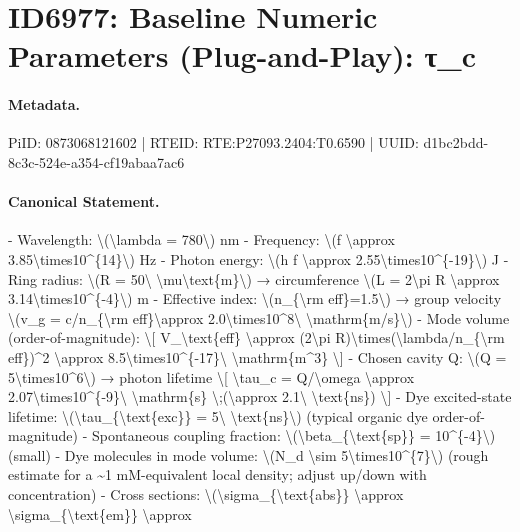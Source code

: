 \section*{ID6977: Baseline Numeric Parameters (Plug-and-Play): τ\_c}
\paragraph{Metadata.}
PiID: 0873068121602 | RTEID: RTE:P27093.2404:T0.6590 | UUID: d1bc2bdd-8c3c-524e-a354-cf19abaa7ac6

\paragraph{Canonical Statement.}
- Wavelength: \textbackslash{}(\textbackslash{}lambda = 780\textbackslash{}) nm - Frequency: \textbackslash{}(f \textbackslash{}approx 3.85\textbackslash{}times10\textasciicircum{}\{14\}\textbackslash{}) Hz - Photon energy: \textbackslash{}(h f \textbackslash{}approx 2.55\textbackslash{}times10\textasciicircum{}\{-19\}\textbackslash{}) J - Ring radius: \textbackslash{}(R = 50\textbackslash{} \textbackslash{}mu\textbackslash{}text\{m\}\textbackslash{}) → circumference \textbackslash{}(L = 2\textbackslash{}pi R \textbackslash{}approx 3.14\textbackslash{}times10\textasciicircum{}\{-4\}\textbackslash{}) m - Effective index: \textbackslash{}(n\_\{\textbackslash{}rm eff\}=1.5\textbackslash{}) → group velocity \textbackslash{}(v\_g = c/n\_\{\textbackslash{}rm eff\}\textbackslash{}approx 2.0\textbackslash{}times10\textasciicircum{}8\textbackslash{} \textbackslash{}mathrm\{m/s\}\textbackslash{}) - Mode volume (order-of-magnitude): \textbackslash{}[ V\_\textbackslash{}text\{eff\} \textbackslash{}approx (2\textbackslash{}pi R)\textbackslash{}times(\textbackslash{}lambda/n\_\{\textbackslash{}rm eff\})\textasciicircum{}2 \textbackslash{}approx 8.5\textbackslash{}times10\textasciicircum{}\{-17\}\textbackslash{} \textbackslash{}mathrm\{m\textasciicircum{}3\} \textbackslash{}] - Chosen cavity Q: \textbackslash{}(Q = 5\textbackslash{}times10\textasciicircum{}6\textbackslash{}) → photon lifetime \textbackslash{}[ \textbackslash{}tau\_c = Q/\textbackslash{}omega \textbackslash{}approx 2.07\textbackslash{}times10\textasciicircum{}\{-9\}\textbackslash{} \textbackslash{}mathrm\{s\} \textbackslash{};(\textbackslash{}approx 2.1\textbackslash{} \textbackslash{}text\{ns\}) \textbackslash{}] - Dye excited-state lifetime: \textbackslash{}(\textbackslash{}tau\_\{\textbackslash{}text\{exc\}\} = 5\textbackslash{} \textbackslash{}text\{ns\}\textbackslash{}) (typical organic dye order-of-magnitude) - Spontaneous coupling fraction: \textbackslash{}(\textbackslash{}beta\_\{\textbackslash{}text\{sp\}\} = 10\textasciicircum{}\{-4\}\textbackslash{}) (small) - Dye molecules in mode volume: \textbackslash{}(N\_d \textbackslash{}sim 5\textbackslash{}times10\textasciicircum{}\{7\}\textbackslash{}) (rough estimate for a \textasciitilde{}1 mM-equivalent local density; adjust up/down with concentration) - Cross sections: \textbackslash{}(\textbackslash{}sigma\_\{\textbackslash{}text\{abs\}\} \textbackslash{}approx \textbackslash{}sigma\_\{\textbackslash{}text\{em\}\} \textbackslash{}approx 